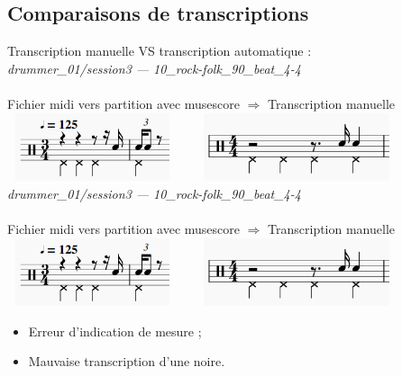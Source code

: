 \subsection{Comparaisons de transcriptions}
Transcription manuelle VS transcription automatique :\\
\textit{drummer\_01/session3 — 10\_rock-folk\_90\_beat\_4-4}\\\\
Fichier midi vers partition avec musescore $\Rightarrow$ Transcription manuelle\\
\includegraphics[height=20mm, width=50mm]{z_images/transcriptions_manuelles/0_prise_en_main/0_tests_drummer_01__session3/musescore_0.png}\ \ \ \ 
\includegraphics[height=20mm, width=55mm]{z_images/transcriptions_manuelles/0_prise_en_main/0_tests_drummer_01__session3/manuel_0.png}
\textit{drummer\_01/session3 — 10\_rock-folk\_90\_beat\_4-4}\\\\
Fichier midi vers partition avec musescore $\Rightarrow$ Transcription manuelle\\
\includegraphics[height=20mm, width=50mm]{z_images/transcriptions_manuelles/0_prise_en_main/0_tests_drummer_01__session3/musescore_0.png}\ \ \ \ 
\includegraphics[height=20mm, width=55mm]{z_images/transcriptions_manuelles/0_prise_en_main/0_tests_drummer_01__session3/manuel_0.png}
\begin{itemize}
	\item Erreur d’indication de mesure ;
	\item Mauvaise transcription d’une noire.\\
\end{itemize}
